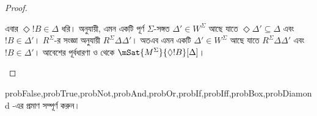 \documentclass[../../../include/open-logic-section]{subfiles}
\begin{document}
\begin{proof}
\begin{enumerate}
{{{          এবার $\Diamond !B \in \Delta$ ধরি।
           অনুযায়ী, এমন একটি পূর্ণ $\Sigma$-সঙ্গত $\Delta' \in W^\Sigma$ আছে যাতে $\Diamond \Delta' \subseteq \Delta$ এবং $!B \in
          \Delta'$। $R^\Sigma$-র সংজ্ঞা অনুযায়ী $R^\Sigma \Delta\Delta'$। অতএব এমন একটি $\Delta' \in W^\Sigma$ আছে যাতে $R^\Sigma
          \Delta\Delta'$ এবং $!B \in \Delta'$। আবেশের পূর্বধারণা ও  থেকে $\mSat{M^\Sigma}{\Diamond
            !B}[\Delta]$।}}}{}
  \end{enumerate}
\end{proof}

\begin{probtag}{probFalse,probTrue,probNot,probAnd,probOr,probIf,probIff,probBox,probDiamond}
  -এর প্রমাণ সম্পূর্ণ করুন।
\end{probtag}
\end{document}
